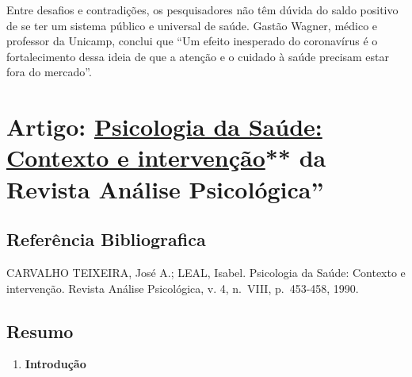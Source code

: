 \documentclass[
]{book}
\providecommand{\tightlist}{%
  \setlength{\itemsep}{0pt}\setlength{\parskip}{0pt}}
\begin{document}
Entre desafios e contradições, os pesquisadores não têm dúvida do saldo
positivo de se ter um sistema público e universal de saúde. Gastão
Wagner, médico e professor da Unicamp, conclui que ``Um efeito
inesperado do coronavírus é o fortalecimento dessa ideia de que a
atenção e o cuidado à saúde precisam estar fora do mercado''.

\hypertarget{artigo-psicologia-da-sauxfade-contexto-e-intervenuxe7uxe3o-da-revista-anuxe1lise-psicoluxf3gica}{%
\section{\texorpdfstring{Artigo:
\href{https://drive.google.com/file/d/1Xph9Bpk8TS42f-cGZP08vVJ3TLEqK3GZ/view?usp=sharing}{Psicologia
da Saúde: Contexto e intervenção}** da Revista \textbf{Análise
Psicológica}''}{Artigo: Psicologia da Saúde: Contexto e intervenção** da Revista Análise Psicológica''}}\label{artigo-psicologia-da-sauxfade-contexto-e-intervenuxe7uxe3o-da-revista-anuxe1lise-psicoluxf3gica}}

\hypertarget{referuxeancia-bibliografica}{%
\subsection{Referência
Bibliografica}\label{referuxeancia-bibliografica}}

CARVALHO TEIXEIRA, José A.; LEAL, Isabel. Psicologia da Saúde: Contexto
e intervenção. Revista Análise Psicológica, v. 4, n.~VIII, p.~453-458,
1990.

\hypertarget{resumo}{%
\subsection{Resumo}\label{resumo}}

\begin{enumerate}
\def\labelenumi{\arabic{enumi}.}
\tightlist
\item
  \textbf{Introdução}
\end{enumerate}
\end{document}
